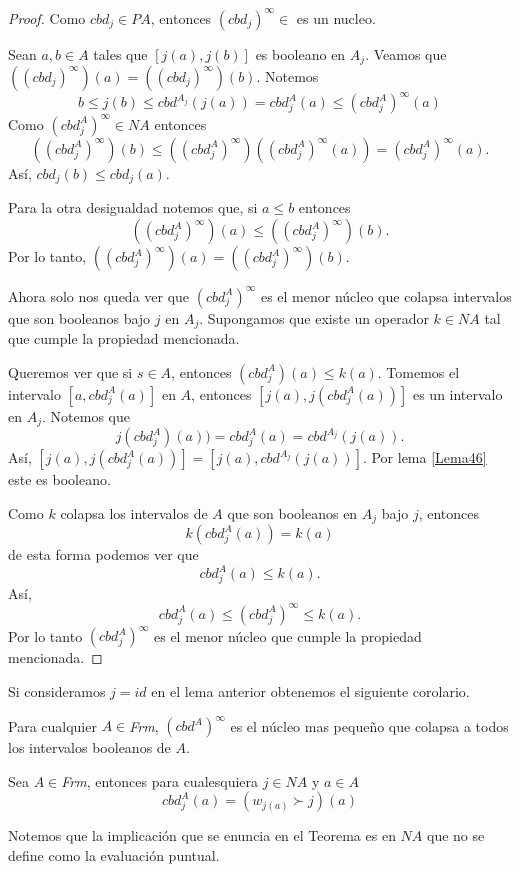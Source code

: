 \begin{proof}
Como $cbd_j\in PA$, entonces $(cbd_j)^\infty\in$ es un nucleo.

\noindent
Sean $a,b\in A$ tales que $[j(a),j(b)]$ es booleano en $A_j$. Veamos que $((cbd_j)^\infty )(a)= ((cbd_j)^\infty )(b)$. Notemos $$b\leq j(b)\leq cbd^{A_j}(j(a))=cbd_j^A(a)\leq (cbd_j^A)^\infty (a)$$
Como $(cbd_j^A)^\infty\in NA$ entonces 
$$((cbd_j^A)^\infty )(b)\leq ((cbd_j^A)^\infty)((cbd_j^A)^\infty (a))= (cbd_j^A)^\infty (a).$$ 
Así, $cbd_j(b)\leq cbd_j(a)$.

\noindent
Para la otra desigualdad notemos que,
si $a\leq b$ entonces
\[
  ((cbd_j^A)^\infty )(a)\leq ((cbd_j^A)^\infty )(b)
.\]
Por lo tanto, $((cbd_j^A)^\infty )(a)= ((cbd_j^A)^\infty )(b)$.

\noindent
Ahora solo nos queda ver que $(cbd_j^A)^\infty$ es el menor núcleo que colapsa intervalos que son booleanos bajo $j$ en $A_j$. Supongamos que existe un operador $k\in NA$ tal que cumple la propiedad mencionada.

\noindent
Queremos ver que si $s\in A$, entonces $(cbd_j^A)(a)\leq k(a)$. Tomemos el intervalo $[a,cbd_j^A(a)]$ en $A$, entonces $[j(a),j(cbd_j^A(a))]$ es un intervalo en $A_j$. Notemos que $$j(cbd_j^A)(a))=cbd_j^A(a)=cbd^{A_j}(j(a)).$$ 
Así, $[j(a), j(cbd_j^A(a))]=[j(a),cbd^{A_j}(j(a))]$. Por lema \ref{Lema46} este es booleano.

\noindent
Como $k$ colapsa los intervalos de $A$ que son booleanos en $A_j$ bajo $j$, entonces $$k(cbd_j^A(a))=k(a)$$
de esta forma podemos ver que $$cbd_j^A(a)\leq k(a).$$ 
Así, $$cbd_j^A(a)\leq (cbd_j^A)^\infty\leq k(a).$$
Por lo tanto $(cbd_j^A)^\infty$ es el menor núcleo que cumple la propiedad mencionada.
\end{proof}

Si consideramos $j=id$ en el lema anterior obtenemos el siguiente corolario.

\begin{corollary}
Para cualquier $A\in$\textit{Frm}, $(cbd^A)^\infty$ es el núcleo mas pequeño que colapsa a todos los intervalos booleanos de $A$.
\end{corollary}

\begin{theorem}
Sea $A\in$\textit{Frm}, entonces para cualesquiera $j\in NA$ y $a\in A$ $$cbd_j^A(a)=(w_{j(a)}\succ j)(a)$$
\end{theorem}
Notemos que la implicación que se enuncia en el Teorema es en $NA$ que no se define como la evaluación puntual.

